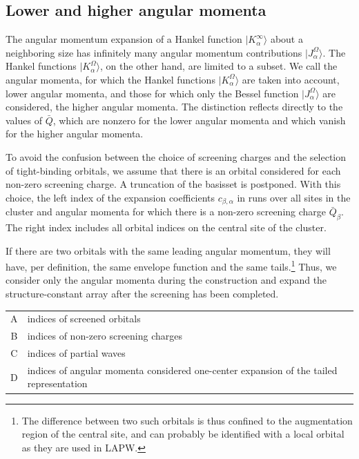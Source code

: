 \documentclass[11pt,a4paper]{report}
\begin{document}
\subsection{Lower and higher angular momenta}
The angular momentum expansion of a Hankel function
$|K^\infty_\alpha\rangle$ about a neighboring size has infinitely many
angular momentum contributions $|J^\Omega_\alpha\rangle$. The Hankel
functions $|K^\Omega_\alpha\rangle$, on the other hand, are limited to
a subset. We call the angular momenta, for which the Hankel functions
$|K^\Omega_\alpha\rangle$ are taken into account, lower angular
momenta, and those for which only the Bessel function
$|J^\Omega_\alpha\rangle$ are considered, the higher angular momenta.
The distinction reflects directly to the values of $\bar{Q}$, which
are nonzero for the lower angular momenta and which vanish for the
higher angular momenta. 

To avoid the confusion between the choice of screening charges and the
selection of tight-binding orbitals, we assume that there is an
orbital considered for each non-zero screening charge. A truncation of
the basisset is postponed.  With this choice, the left index of the
expansion coefficients $c_{\beta,\alpha}$ in
 runs over all sites in the cluster and
angular momenta for which there is a non-zero screening charge
$\bar{Q}_\beta$. The right index includes all orbital indices on the
central site of the cluster.

If there are two orbitals with the same leading angular momentum, they
will have, per definition, the same envelope function and the same
tails.\footnote{The difference between two such orbitals is thus
  confined to the augmentation region of the central site, and can
  probably be identified with a local orbital as they are used in
  LAPW.} Thus, we consider only the angular momenta during the
construction and expand the structure-constant array after the
screening has been completed.

\begin{center}
\begin{tabular}{|c|l|}
\hline
A&indices of screened orbitals\\
B&indices of non-zero screening charges\\
C&indices of partial waves\\
D&indices of angular momenta considered one-center expansion of 
the tailed representation\\
\hline
\end{tabular}
\end{center}
\end{document}
